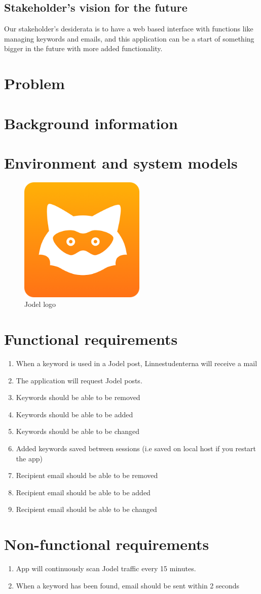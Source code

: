 \documentclass[a4paper,12pt]{article}
\begin{document}
\subsection{Stakeholder's vision for the future}
Our stakeholder's desiderata is to have a web based interface with functions like managing keywords and emails, and this application can be a start of something bigger in the future with more added functionality.

\section{Problem}

\section{Background information}

\section{Environment and system models}

\begin{figure}[!h]
	\centering
	\includegraphics[height=6cm]{img/jodel.png}
	\caption{Jodel logo}
	\label{Cisco routing}
\end{figure}
\section{Functional requirements}
\begin{enumerate}
	\item When a keyword is used in a Jodel post, Linnestudenterna will receive a mail
	\item The application will request Jodel posts.
	\item Keywords should be able to be removed
	\item Keywords should be able to be added
	\item Keywords should be able to be changed
	\item Added keywords saved between sessions (i.e saved on local host if you restart the app)
	\item Recipient email should be able to be removed
	\item Recipient email should be able to be added
	\item Recipient email should be able to be changed
\end{enumerate}
\section{Non-functional requirements}
\begin{enumerate}
	\item App will continuously scan Jodel traffic every 15 minutes.
	\item When a keyword has been found, email should be sent within 2 seconds
\end{enumerate}
\end{document}
